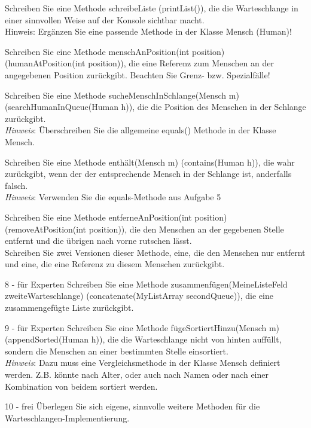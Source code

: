 \documentclass{article}
\begin{document}
\begin{task}{3}
Schreiben Sie eine Methode schreibeListe (printList()), die die Warteschlange in einer sinnvollen Weise 
auf der Konsole sichtbar macht. \\
Hinweis: Ergänzen Sie eine passende Methode in der Klasse Mensch (Human)!
\end{task}

\begin{task}{4}
Schreiben Sie eine Methode menschAnPosition(int position) (humanAtPosition(int position)), die eine 
Referenz zum Menschen an der angegebenen Position zurückgibt. Beachten Sie Grenz- bzw. Spezialfälle!
\end{task}

\begin{task}{5}
    Schreiben Sie eine Methode sucheMenschInSchlange(Mensch m) (searchHumanInQueue(Human h)), die die Position 
    des Menschen in der Schlange zurückgibt. \\
    \textit{Hinweis}: Überschreiben Sie die allgemeine equals() Methode in der Klasse Mensch.
\end{task}

\begin{task}{6}
    Schreiben Sie eine Methode enthält(Mensch m) (contains(Human h)), die wahr zurückgibt, wenn 
    der der entsprechende Mensch in der Schlange ist, anderfalls falsch. \\
    \textit{Hinweis}: Verwenden Sie die equals-Methode aus Aufgabe 5
\end{task}
\begin{task}{7}
    Schreiben Sie eine Methode entferneAnPosition(int position) (removeAtPosition(int position)), die den 
    Menschen an der gegebenen Stelle entfernt und die übrigen nach vorne rutschen lässt. \\
    Schreiben Sie zwei Versionen dieser Methode, eine, die den Menschen nur entfernt und eine, die 
    eine Referenz zu diesem Menschen zurückgibt.
\end{task}

\begin{task}{8 - für Experten}
    Schreiben Sie eine Methode zusammenfügen(MeineListeFeld zweiteWarteschlange) (concatenate(MyListArray secondQueue)),
    die eine zusammengefügte Liste zurückgibt. 
\end{task}

\begin{task}{9 - für Experten}
    Schreiben Sie eine Methode fügeSortiertHinzu(Mensch m) (appendSorted(Human h)), die die Warteschlange nicht 
    von hinten auffüllt, sondern die Menschen an einer bestimmten Stelle einsortiert. \\
    \textit{Hinweis}: Dazu muss eine Vergleichsmethode in der Klasse Mensch definiert werden. Z.B. könnte nach Alter, oder auch nach 
    Namen oder nach einer Kombination von beidem sortiert werden. 
\end{task}

\begin{task}{10 - frei}
    Überlegen Sie sich eigene, sinnvolle weitere Methoden für die Warteschlangen-Implementierung.
\end{task}
\end{document}
